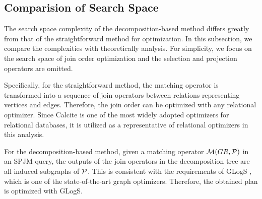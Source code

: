 
\subsection{Comparision of Search Space}
\label{sec:compare-search-space}

The search space complexity of the decomposition-based method differs greatly from that of the straightforward method for optimization.
In this subsection, we compare the complexities with theoretically analysis.
For simplicity, we focus on the search space of join order optimization and the selection and projection operators are omitted.

Specifically, for the straightforward method, the matching operator is transformed into a sequence of join operators between relations representing vertices and edges.
Therefore, the join order can be optimized with any relational optimizer.
Since Calcite \cite{calcite,columbia} is one of the most widely adopted optimizers for relational databases, it is utilized as a representative of relational optimizers in this analysis.

For the decomposition-based method, given a matching operator $\mathcal{M}(GR, \mathcal{P})$ in an SPJM query, the outputs of the join operators in the decomposition tree are all induced subgraphs of $\mathcal{P}$.
This is consistent with the requirements of GLogS \cite{GLogS}, which is one of the state-of-the-art graph optimizers.
Therefore, the obtained plan is optimized with GLogS.


